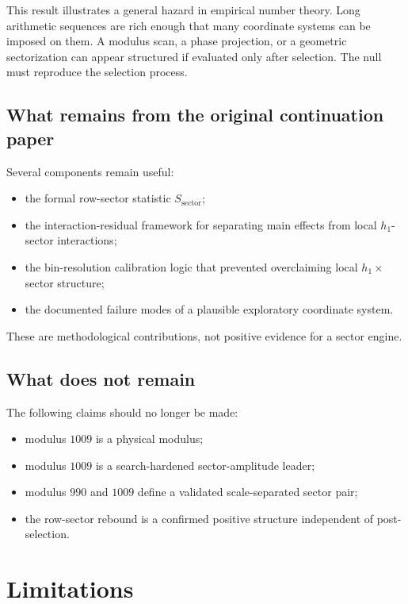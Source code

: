 \documentclass[11pt]{article}
\begin{document}
This result illustrates a general hazard in empirical number theory. Long arithmetic sequences are rich enough that many coordinate systems can be imposed on them. A modulus scan, a phase projection, or a geometric sectorization can appear structured if evaluated only after selection. The null must reproduce the selection process.

\subsection{What remains from the original continuation paper}

Several components remain useful:
\begin{itemize}
    \item the formal row-sector statistic \(S_{\mathrm{sector}}\);
    \item the interaction-residual framework for separating main effects from local \(h_1\)-sector interactions;
    \item the bin-resolution calibration logic that prevented overclaiming local \(h_1\times\)sector structure;
    \item the documented failure modes of a plausible exploratory coordinate system.
\end{itemize}
These are methodological contributions, not positive evidence for a sector engine.

\subsection{What does not remain}

The following claims should no longer be made:
\begin{itemize}
    \item modulus \(1009\) is a physical modulus;
    \item modulus \(1009\) is a search-hardened sector-amplitude leader;
    \item modulus \(990\) and \(1009\) define a validated scale-separated sector pair;
    \item the row-sector rebound is a confirmed positive structure independent of post-selection.
\end{itemize}

\section{Limitations}
\end{document}
